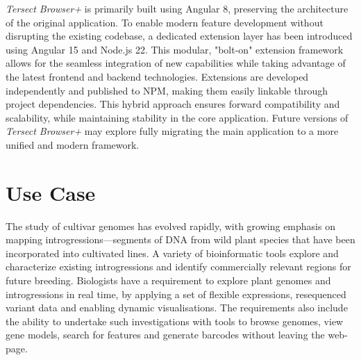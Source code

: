 \documentclass[12pt]{article}
\begin{document}


\textit{Tersect Browser+} is primarily built using Angular 8, preserving the architecture of the original application. To enable modern feature development without disrupting the existing codebase, a dedicated extension layer has been introduced using Angular 15 and Node.js 22. This modular, "bolt-on" extension framework allows for the seamless integration of new capabilities while taking advantage of the latest frontend and backend technologies. Extensions are developed independently and published to NPM, making them easily linkable through project dependencies. This hybrid approach ensures forward compatibility and scalability, while maintaining stability in the core application. Future versions of \textit{Tersect Browser+} may explore fully migrating the main application to a more unified and modern framework.

\section{Use Case}

The study of cultivar genomes has evolved rapidly, with growing emphasis on mapping introgressions—segments of DNA from wild plant species that have been incorporated into cultivated lines. A variety of bioinformatic tools explore and characterize existing introgressions and identify commercially relevant regions for future breeding. Biologists have a requirement to explore plant genomes and introgressions in real time, by applying a set of flexible expressions, resequenced variant data and enabling dynamic visualisations. The requirements also include the ability to undertake such investigations with tools to browse genomes, view gene models, search for features and generate barcodes without leaving the web-page. 
\end{document}
